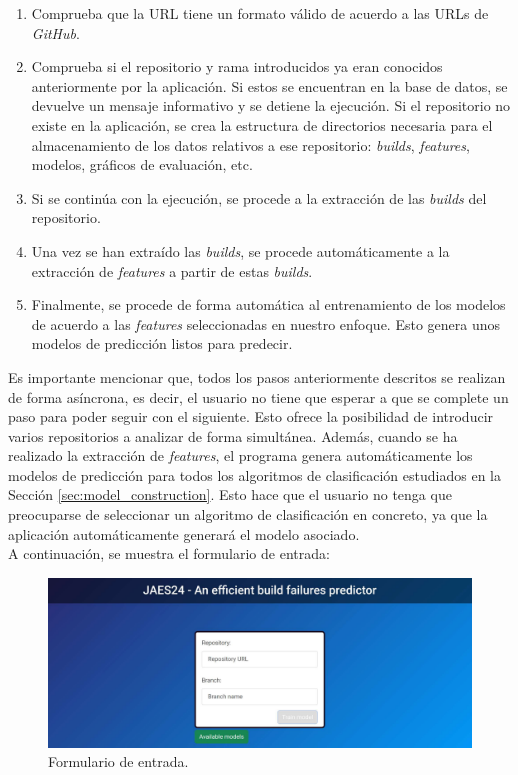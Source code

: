 \begin{enumerate}
    \item Comprueba que la URL tiene un formato válido de acuerdo a las URLs de \textit{GitHub}.\\
    \item Comprueba si el repositorio y rama introducidos ya eran conocidos anteriormente por la
    aplicación. Si estos se encuentran en la base de datos, se devuelve un mensaje informativo y
    se detiene la ejecución. Si el repositorio no existe en la aplicación, se crea la estructura
    de directorios necesaria para el almacenamiento de los datos relativos a ese repositorio:
    \textit{builds}, \textit{features}, modelos, gráficos de evaluación, etc.\\
    \item Si se continúa con la ejecución, se procede a la extracción de las \textit{builds} del 
    repositorio.\\
    \item Una vez se han extraído las \textit{builds}, se procede automáticamente a la extracción
    de \textit{features} a partir de estas \textit{builds}.\\
    \item Finalmente, se procede de forma automática al entrenamiento de los modelos de acuerdo a
    las \textit{features} seleccionadas en nuestro enfoque. Esto genera unos modelos de predicción
    listos para predecir.\\
\end{enumerate}

Es importante mencionar que, todos los pasos anteriormente descritos se realizan de forma
asíncrona, es decir, el usuario no tiene que esperar a que se complete un paso para poder seguir
con el siguiente. Esto ofrece la posibilidad de introducir varios repositorios a analizar de
forma simultánea. Además, cuando se ha realizado la extracción de \textit{features}, el programa
genera automáticamente los modelos de predicción para todos los algoritmos de clasificación
estudiados en la Sección \ref{sec:model_construction}. Esto hace que el usuario no tenga que
preocuparse de seleccionar un algoritmo de clasificación en concreto, ya que la aplicación
automáticamente generará el modelo asociado.\\

\noindent A continuación, se muestra el formulario de entrada:

\begin{figure}[H]
    \centering
    \includegraphics[scale=0.3]{images/input-form.pdf}
    \caption{Formulario de entrada.}
    \label{fig:input_form}
\end{figure}

